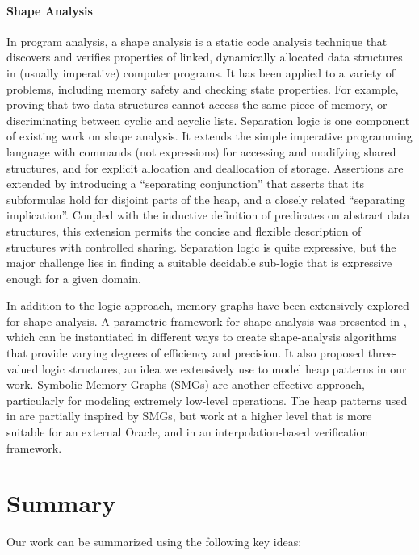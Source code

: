 \paragraph{Shape Analysis}
In program analysis, a shape analysis is a static code analysis technique that discovers and verifies properties of linked, dynamically allocated data structures in (usually imperative) computer programs. It has been applied to a variety of problems, including memory safety and checking state properties. For example, proving that two data structures cannot access the same piece of memory, or discriminating between cyclic and acyclic lists. Separation logic \cite{calcagano11,reynolds02} is one component of existing work on shape analysis. It extends the simple imperative programming language with commands (not expressions) for accessing and modifying shared structures, and for explicit allocation and deallocation of storage. Assertions are extended by introducing a ``separating conjunction'' that asserts that its subformulas hold for disjoint parts of the heap, and a closely related ``separating implication''. Coupled with the inductive definition of predicates on abstract data structures, this extension permits the concise and flexible description of
structures with controlled sharing. Separation logic is quite expressive, but the major challenge lies in finding a suitable decidable sub-logic that is expressive enough for a given domain.

In addition to the logic approach, memory graphs have been extensively explored for shape analysis. A parametric framework for shape analysis was presented in \cite{sagiv02}, which can be instantiated in different ways to create shape-analysis algorithms that provide varying degrees of efficiency and precision. It also proposed three-valued logic structures, an idea we extensively use to model heap patterns in our work. Symbolic Memory Graphs (SMGs) \cite{dudka13} are another effective approach, particularly for modeling extremely low-level operations. The heap patterns used in \verifier are partially inspired by SMGs, but work at a higher level that is more suitable for an external Oracle, and in an interpolation-based verification framework.

\section{Summary}
Our work can be summarized using the following key ideas:

